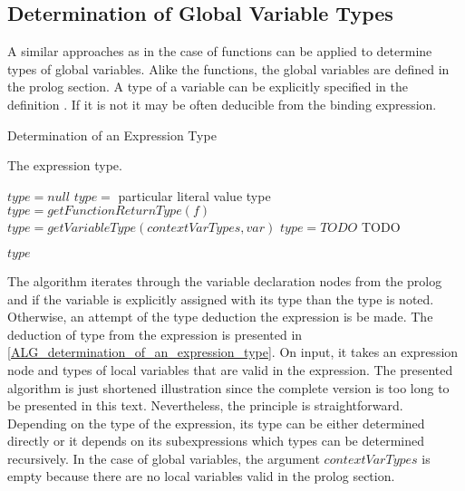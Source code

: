 \subsection{Determination of Global Variable Types}
A similar approaches as in the case of functions can be applied to determine types of global variables. Alike the functions, the global variables are defined in the prolog section. A type of a variable can be explicitly specified in the definition . If it is not it may be often deducible from the binding expression.

\begin{algorithm}
\caption{Determination of an Expression Type}
\label{ALG_determination_of_an_expression_type}
\begin{algorithmic}[1]
\ENSURE The expression type.

\STATE $type = null$
     \STATE $type =$ particular literal value type
     \STATE $type = getFunctionReturnType(f)$
     \STATE $type = getVariableType(contextVarTypes, var)$
     \STATE $type = TODO$
      \STATE TODO
\ENDIF

\RETURN $type$
\end{algorithmic}
\end{algorithm}

The algorithm iterates through the variable declaration nodes from the prolog and if the variable is explicitly assigned with its type than the type is noted. Otherwise, an attempt of the type deduction the expression is be made. The deduction of type from the expression is presented in \ref{ALG_determination_of_an_expression_type}. On input, it takes an expression node and types of local variables that are valid in the expression. The presented algorithm is just shortened illustration since the complete version is too long to be presented in this text. Nevertheless, the principle is straightforward. Depending on the type of the expression, its type can be either determined directly or it depends on its subexpressions which types can be determined recursively. In the case of global variables, the argument $contextVarTypes$ is empty because there are no local variables valid in the prolog section.

